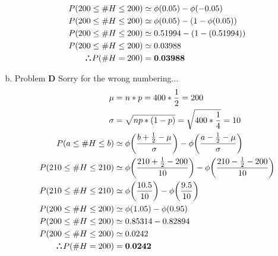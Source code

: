 \documentclass[10pt]{report}
\def\therefore{\boldsymbol{\text{ }
\leavevmode
\lower0.4ex\hbox{$\cdot$}
\kern-.5em\raise0.7ex\hbox{$\cdot$}
\kern-0.6em\lower0.4ex\hbox{$\cdot$}
\thinspace\text{ }}}
\begin{document}
\begin{enumerate}[(a)]
\begin{align*}
P(200 \leq \#H \leq 200) &\simeq \phi (0.05) - \phi(-0.05) \\
P(200 \leq \#H \leq 200) &\simeq \phi (0.05) - (1-\phi(0.05)) \\
P(200 \leq \#H \leq 200) &\simeq 0.51994 - (1-(0.51994)) \\
P(200 \leq \#H \leq 200) &\simeq 0.03988 \\
\therefore P(\#H = 200) &= \mathbf{0.03988} \\
\end{align*}
\item Problem \textbf{D} Sorry for the wrong numbering...
\begin{align*}
\mu &= n*p = 400*\frac{1}{2} = 200\\
\sigma &= \sqrt{np*(1-p)} = \sqrt{400*\frac{1}{4}} = 10\\
P(a \leq \#H \leq b) &\simeq \phi \bigg(\frac{b+\frac{1}{2} - \mu}{\sigma}\bigg) - \phi \bigg(\frac{a-\frac{1}{2} - \mu}{\sigma}\bigg) \\
P(210 \leq \#H \leq 210) &\simeq \phi \bigg(\frac{210+\frac{1}{2} - 200}{10}\bigg) - \phi \bigg(\frac{210-\frac{1}{2} - 200}{10}\bigg) \\
P(210 \leq \#H \leq 210) &\simeq \phi \bigg(\frac{10.5}{10}\bigg) - \phi \bigg(\frac{9.5}{10}\bigg) \\
P(200 \leq \#H \leq 200) &\simeq \phi (1.05) - \phi(0.95) \\
P(200 \leq \#H \leq 200) &\simeq 0.85314 - 0.82894 \\
P(200 \leq \#H \leq 200) &\simeq 0.0242 \\
\therefore P(\#H = 200) &= \mathbf{0.0242} \\
\end{align*}
 \end{enumerate}
\end{document}
